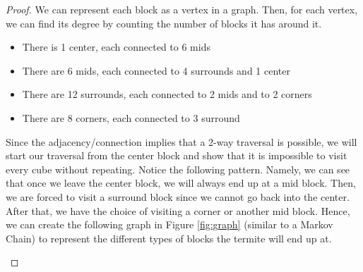 \documentclass{article}
\begin{document}
\begin{proof}
  We can represent each block as a vertex in a graph. Then, for each vertex, we
  can find its degree by counting the number of blocks it has around it.
  \begin{itemize}
    \item There is 1 center, each connected to 6 mids
    \item There are 6 mids, each connected to 4 surrounds and 1 center
    \item There are 12 surrounds, each connected to 2 mids and to 2 corners
    \item There are 8 corners, each connected to 3 surround
  \end{itemize}

  Since the adjacency/connection implies that a 2-way traversal is possible, we
  will start our traversal from the center block and show that it is impossible
  to visit every cube without repeating. Notice the following pattern. Namely,
  we can see that once we leave the center block, we will always end up at a mid
  block. Then, we are forced to visit a surround block since we cannot go back
  into the center. After that, we have the choice of visiting a corner or
  another mid block. Hence, we can create the following graph in Figure
  \ref{fig:graph} (similar to a Markov Chain) to represent the different types
  of blocks the termite will end up at.

  \begin{figure}[ht]
    \centering

    \begin{tikzpicture}[x=0.75pt,y=0.75pt,yscale=-1,xscale=1]


\end{tikzpicture}
\end{figure}
\end{proof}
\end{document}
